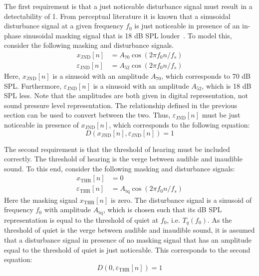 The first requirement is that a just noticeable disturbance signal must result in a detectability of 1.
From perceptual literature it is known that a sinusoidal disturbance signal at a given frequency $f_0$ is just noticeable 
in presence of an in-phase sinusoidal masking signal that is 18 dB SPL louder~\cite{van2005perceptual}.
To model this, consider the following masking and disturbance signals. 
\begin{align}
    x_\text{JND}[n] &= A_{70}\cos\left(2\pi f_0 n / f_s\right) \\
    \varepsilon_\text{JND}[n] &= A_{52}\cos\left(2\pi f_0 n / f_s\right)
\end{align}
Here, $x_\text{JND}[n]$ is a sinusoid with an amplitude $A_{70}$, which corresponds to 70 dB SPL.
Furthermore, $\varepsilon_\text{JND}[n]$ is a sinusoid with an amplitude $A_{52}$, which is 18 dB SPL less.
Note that the amplitudes are both given in digital representation, not sound pressure level representation.
The relationship defined in the previous section can be used to convert between the two.
Thus, $\varepsilon_\text{JND}[n]$ must be just noticeable in presence of $x_\text{JND}[n]$, which corresponds to the following equation:
\begin{equation}
    D(x_\text{JND}[n],\varepsilon_\text{JND}[n]) = 1
\end{equation}

The second requirement is that the threshold of hearing must be included correctly.
The threshold of hearing is the verge between audible and inaudible sound.
To this end, consider the following masking and disturbance signals:
\begin{align}
    x_\text{THR}[n] &= 0 \\
    \varepsilon_\text{THR}[n] &= A_{\text{tq}}\cos\left(2\pi f_0 n / f_s\right)
\end{align}
Here the masking signal $x_\text{THR}[n]$ is zero. 
The disturbance signal is a sinusoid of frequency $f_0$ with amplitude $A_{\text{tq}}$, which is chosen such that its dB SPL representation is equal to 
the threshold of quiet at $f_0$, i.e. $T_q(f_0)$. 
As the threshold of quiet is the verge between audible and inaudible sound, it is assumed that a disturbance signal in presence of no masking signal that has
an amplitude equal to the threshold of quiet is just noticeable.
This corresponds to the second equation:
\begin{equation}
    D(0,\varepsilon_\text{THR}[n]) = 1
\end{equation}


